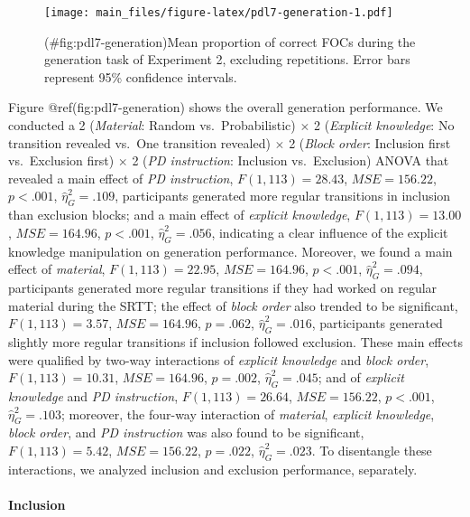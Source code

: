 \begin{appendix}
\begin{figure}
\centering
\texttt{[image: main\_files/figure-latex/pdl7-generation-1.pdf]}
\caption{(\#fig:pdl7-generation)Mean proportion of correct FOCs during
the generation task of Experiment 2, excluding repetitions. Error bars
represent 95\% confidence intervals.}
\end{figure}

Figure @ref(fig:pdl7-generation) shows the overall generation
performance. We conducted a 2 (\emph{Material}: Random
vs.~Probabilistic) \(\times\) 2 (\emph{Explicit knowledge}: No
transition revealed vs.~One transition revealed) \(\times\) 2
(\emph{Block order}: Inclusion first vs.~Exclusion first) \(\times\) 2
(\emph{PD instruction}: Inclusion vs.~Exclusion) ANOVA that revealed a
main effect of \emph{PD instruction}, \(F(1, 113) = 28.43\),
\(\mathit{MSE} = 156.22\), \(p < .001\), \(\hat{\eta}^2_G = .109\),
participants generated more regular transitions in inclusion than
exclusion blocks; and a main effect of \emph{explicit knowledge},
\(F(1, 113) = 13.00\), \(\mathit{MSE} = 164.96\), \(p < .001\),
\(\hat{\eta}^2_G = .056\), indicating a clear influence of the explicit
knowledge manipulation on generation performance. Moreover, we found a
main effect of \emph{material}, \(F(1, 113) = 22.95\),
\(\mathit{MSE} = 164.96\), \(p < .001\), \(\hat{\eta}^2_G = .094\),
participants generated more regular transitions if they had worked on
regular material during the SRTT; the effect of \emph{block order} also
trended to be significant, \(F(1, 113) = 3.57\),
\(\mathit{MSE} = 164.96\), \(p = .062\), \(\hat{\eta}^2_G = .016\),
participants generated slightly more regular transitions if inclusion
followed exclusion. These main effects were qualified by two-way
interactions of \emph{explicit knowledge} and \emph{block order},
\(F(1, 113) = 10.31\), \(\mathit{MSE} = 164.96\), \(p = .002\),
\(\hat{\eta}^2_G = .045\); and of \emph{explicit knowledge} and \emph{PD
instruction}, \(F(1, 113) = 26.64\), \(\mathit{MSE} = 156.22\),
\(p < .001\), \(\hat{\eta}^2_G = .103\); moreover, the four-way
interaction of \emph{material}, \emph{explicit knowledge}, \emph{block
order}, and \emph{PD instruction} was also found to be significant,
\(F(1, 113) = 5.42\), \(\mathit{MSE} = 156.22\), \(p = .022\),
\(\hat{\eta}^2_G = .023\). To disentangle these interactions, we
analyzed inclusion and exclusion performance, separately.

\paragraph{Inclusion}\label{inclusion}


\end{appendix}
